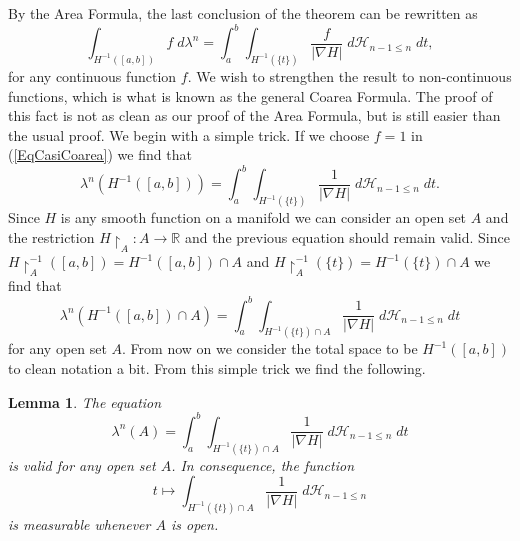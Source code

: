 \documentclass[%
 aip,
 amsmath,amssymb,
 reprint,%
jmp]{revtex4-2}
\newtheorem{lemma}{Lemma}[section]
\begin{document}
By the Area Formula, the last conclusion of the theorem can be rewritten as
\begin{equation}\label{EqCasiCoarea}
    \int_{H^{-1}([a,b])} f\;d\lambda^{n} = \int_{a}^{b}\int_{H^{-1}(\{t\})} \frac{f}{|\nabla H|}\;d\mathscr{H}_{n-1\leq n}\;dt,
\end{equation}
for any continuous function $f$. We wish to strengthen the result to non-continuous functions, which is what is known as the general Coarea Formula. The proof of this fact is not as clean as our proof of the Area Formula, but is still easier than the usual proof. We begin with a simple trick. If we choose $f = 1$ in (\ref{EqCasiCoarea}) we find that
\begin{equation*}
    \lambda^{n}(H^{-1}([a,b])) = \int_{a}^{b}\int_{H^{-1}(\{t\})} \frac{1}{|\nabla H|}\;d\mathscr{H}_{n-1\leq n}\;dt.
\end{equation*}
Since $H$ is any smooth function on a manifold we can consider an open set $A$ and the restriction $H\restriction_{A}\colon A \to \mathbb{R}$ and the previous equation should remain valid. Since $H\restriction_{A}^{-1}([a,b]) = H^{-1}([a,b])\cap A$ and $H\restriction_{A}^{-1}(\{t\}) = H^{-1}(\{t\})\cap A$ we find that
\begin{equation*}
    \lambda^{n}(H^{-1}([a,b])\cap A) = \int_{a}^{b}\int_{H^{-1}(\{t\})\cap A} \frac{1}{|\nabla H|}\;d\mathscr{H}_{n-1\leq n}\;dt
\end{equation*}
for any open set $A$. From now on we consider the total space to be $H^{-1}([a,b])$ to clean notation a bit. From this simple trick we find the following.

\begin{lemma}
The equation
\begin{equation}\label{EqIntegralMeasure}
    \lambda^{n}(A) = \int_{a}^{b}\int_{H^{-1}(\{t\})\cap A} \frac{1}{|\nabla H|}\;d\mathscr{H}_{n-1\leq n}\;dt
\end{equation}
is valid for any open set $A$. In consequence, the function
\begin{equation*}
    t \longmapsto \int_{H^{-1}(\{t\})\cap A} \frac{1}{|\nabla H|}\;d\mathscr{H}_{n-1\leq n}
\end{equation*}
is measurable whenever $A$ is open.
\end{lemma}
\end{document}
